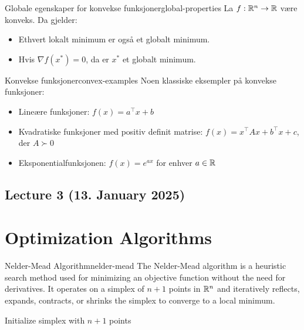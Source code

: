 \begin{theorem}{Globale egenskaper for konvekse funksjoner}{global-properties}
  La  \(f: \mathbb{R}^n \to \mathbb{R}\) være konveks. Da gjelder:
  \begin{itemize}
    \item Ethvert lokalt minimum er også et globalt minimum.
    \item Hvis  \(\nabla f(x^*) = 0\), da er  \(x^*\) et globalt minimum.
  \end{itemize}
\end{theorem}

\begin{example}{Konvekse funksjoner}{convex-examples}
  Noen klassiske eksempler på konvekse funksjoner:
  \begin{itemize}
    \item Lineære funksjoner:  \(f(x) = a^\top x + b\)
    \item Kvadratiske funksjoner med positiv definit matrise:  \(f(x) = x^\top Ax + b^\top x + c\), der  \(A \succ 0\)
    \item Eksponentialfunksjonen:  \(f(x) = e^{ax}\) for enhver  \(a \in \mathbb{R}\)
  \end{itemize}
\end{example}


\subsection{Lecture 3 (13. January 2025)}
\section*{Optimization Algorithms}

\begin{definition}{Nelder-Mead Algorithm}{nelder-mead}
  The Nelder-Mead algorithm is a heuristic search method used for minimizing an objective function without the need for derivatives. It operates on a simplex of \( n+1 \) points in \( \mathbb{R}^n \) and iteratively reflects, expands, contracts, or shrinks the simplex to converge to a local minimum.

\end{definition}

\begin{algorithm}[H]
  \caption{Nelder-Mead Algorithm}
  \label{alg:nelder-mead}
  Initialize simplex with  \(n+1\) points\;
\end{algorithm}

